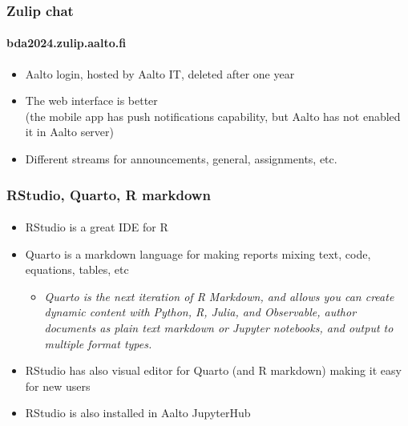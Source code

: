 \documentclass[english,t]{beamer}
\begin{document}
\begin{frame}

  \frametitle{Zulip chat}  %
  \framesubtitle{bda2024.zulip.aalto.fi}

  \begin{itemize}
  \item Aalto login, hosted by Aalto IT, deleted after one year
  \item The web interface is better\\ (the mobile app has push
    notifications capability, but Aalto has not enabled it in Aalto
    server)
  \item Different streams for announcements, general, assignments, etc.
  \end{itemize}
  
\end{frame}

\begin{frame}

  \frametitle{RStudio, Quarto, R markdown}  %
  \framesubtitle{}

  \begin{itemize}
  \item RStudio is a great IDE for R
  \item Quarto is a markdown language for making reports mixing
    text, code, equations, tables, etc
    \begin{itemize}
    \item \textit{Quarto is the next iteration of R Markdown, and
        allows you can create dynamic content with Python, R, Julia,
        and Observable, author documents as plain text markdown or
        Jupyter notebooks, and output to multiple format types.}
    \end{itemize}
  \item RStudio has also visual editor for Quarto (and R markdown)
    making it easy for new users
  \item RStudio is also installed in Aalto JupyterHub
  \end{itemize}
  
\end{frame}  
\end{document}
